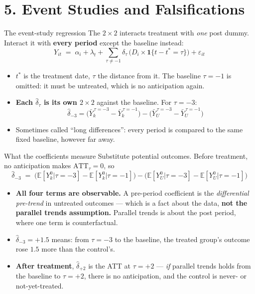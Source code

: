 \documentclass[
  11pt,
  ignorenonframetext,
  aspectratio=169,
]{beamer}
\providecommand{\tightlist}{%
  \setlength{\itemsep}{0pt}\setlength{\parskip}{0pt}}
\begin{document}
\section{5. Event Studies and
Falsifications}\label{event-studies-and-falsifications}

\begin{frame}{The event-study regression}
\protect{}\label{the-event-study-regression}
The \(2 \times 2\) interacts treatment with \emph{one} post dummy.
Interact it with \textbf{every period} except the baseline instead: \[
Y_{it} \;=\; \alpha_i + \lambda_t + \sum_{\tau \neq -1} \delta_\tau\, \big(D_i \times \mathbf{1}\{t - t^{*} = \tau\}\big) + \varepsilon_{it}
\]

\begin{itemize}
\tightlist
\item
  \(t^{*}\) is the treatment date, \(\tau\) the distance from it. The
  baseline \(\tau = -1\) is omitted: it must be untreated, which is no
  anticipation again.
\item
  \textbf{Each \(\hat\delta_\tau\) is its own \(2 \times 2\)} against
  the baseline. For \(\tau = -3\): \[
  \hat\delta_{-3} = \big(\bar Y_k^{\,\tau=-3} - \bar Y_k^{\,\tau=-1}\big) - \big(\bar Y_U^{\,\tau=-3} - \bar Y_U^{\,\tau=-1}\big)
  \]
\item
  Sometimes called ``long differences'': every period is compared to the
  same fixed baseline, however far away.
\end{itemize}
\end{frame}

\begin{frame}{What the coefficients measure}
\protect{}\label{what-the-coefficients-measure}
Substitute potential outcomes. Before treatment, no anticipation makes
\(\text{ATT}_{\tau} = 0\), so \[
\hat\delta_{-3} \;=\; \big(\mathbb{E}[Y^0_k|\tau=-3] - \mathbb{E}[Y^0_k|\tau=-1]\big) - \big(\mathbb{E}[Y^0_U|\tau=-3] - \mathbb{E}[Y^0_U|\tau=-1]\big)
\]

\begin{itemize}
\tightlist
\item
  \textbf{All four terms are observable.} A pre-period coefficient is
  the \emph{differential pre-trend} in untreated outcomes --- which is a
  fact about the data, \textbf{not the parallel trends assumption.}
  Parallel trends is about the post period, where one term is
  counterfactual.
\item
  \(\hat\delta_{-3} = +1.5\) means: from \(\tau=-3\) to the baseline,
  the treated group's outcome rose \(1.5\) more than the control's.
\item
  \textbf{After treatment}, \(\hat\delta_{+2}\) is the ATT at
  \(\tau = +2\) --- \emph{if} parallel trends holds from the baseline to
  \(\tau=+2\), there is no anticipation, and the control is never- or
  not-yet-treated.
\end{itemize}
\end{frame}
\end{document}
